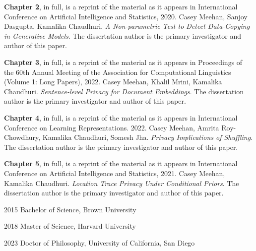 \documentclass[12pt]{ucsddissertation}
\begin{document}
\begin{acknowledgements}
\textbf{Chapter 2}, in full, is a reprint of the material as it appears in International Conference on Artificial Intelligence and Statistics, 2020. Casey Meehan, Sanjoy Dasgupta, Kamalika Chaudhuri. \emph{A Non-parametric Test to Detect Data-Copying in Generative Models}. The dissertation author is the primary investigator and author of this paper. 

\textbf{Chapter 3}, in full, is a reprint of the material as it appears in Proceedings of the 60th Annual Meeting of the Association for Computational Linguistics (Volume 1: Long Papers), 2022. Casey Meehan, Khalil Mrini, Kamalika Chaudhuri. \emph{Sentence-level Privacy for Document Embeddings}. The dissertation author is the primary investigator and author of this paper. 

\textbf{Chapter 4}, in full, is a reprint of the material as it appears in International Conference on Learning Representations. 2022. Casey Meehan, Amrita Roy-Chowdhury, Kamalika Chaudhuri, Somesh Jha. \emph{Privacy Implications of Shuffling}. The dissertation author is the primary investigator and author of this paper.

\textbf{Chapter 5}, in full, is a reprint of the material as it appears in International Conference on Artificial Intelligence and Statistics, 2021. Casey Meehan, Kamalika Chaudhuri. \emph{Location Trace Privacy Under Conditional Priors}. The dissertation author is the primary investigator and author of this paper. 
\end{acknowledgements}

\begin{vita}
\noindent
\begin{cv}{}
\begin{cvlist}{}
\item[2015] Bachelor of Science, Brown University
\item[2018] Master of Science, Harvard University
\item[2023] Doctor of Philosophy, University of California, San Diego
\end{cvlist}
\end{cv}


\end{vita}
\end{document}

